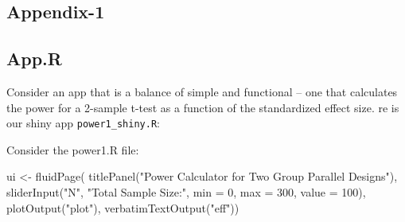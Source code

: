 \documentclass[
  letterpaper,
  DIV=11,
  numbers=noendperiod,
  oneside]{scrartcl}
\newenvironment{Shaded}{\begin{snugshade}}{\end{snugshade}}
\newcommand{\ErrorTok}[1]{\textcolor[rgb]{0.68,0.00,0.00}{#1}}
\newcommand{\ExtensionTok}[1]{\textcolor[rgb]{0.00,0.23,0.31}{#1}}
\newcommand{\KeywordTok}[1]{\textcolor[rgb]{0.00,0.23,0.31}{#1}}
\newcommand{\NormalTok}[1]{\textcolor[rgb]{0.00,0.23,0.31}{#1}}
\newcommand{\OperatorTok}[1]{\textcolor[rgb]{0.37,0.37,0.37}{#1}}
\newcommand{\StringTok}[1]{\textcolor[rgb]{0.13,0.47,0.30}{#1}}
\begin{document}
\hypertarget{appendix-1}{%
\subsection{Appendix-1}\label{appendix-1}}

\hypertarget{app.r}{%
\subsection{App.R}\label{app.r}}

Consider an app that is a balance of simple and functional -- one that
calculates the power for a 2-sample t-test as a function of the
standardized effect size. re is our shiny app \texttt{power1\_shiny.R}:

Consider the power1.R file:

\begin{Shaded}
\begin{Highlighting}[]

\ExtensionTok{ui} \OperatorTok{\textless{}}\NormalTok{{-} fluidPage}\ErrorTok{(}
\ExtensionTok{titlePanel}\ErrorTok{(}\StringTok{"Power Calculator for Two Group Parallel Designs"}\KeywordTok{)}\ExtensionTok{,}
\ExtensionTok{sliderInput}\ErrorTok{(}\StringTok{"N"}\ExtensionTok{,} \StringTok{"Total Sample Size:"}\NormalTok{, min = 0, max = 300, value = 100}\KeywordTok{)}\ExtensionTok{,}
\ExtensionTok{plotOutput}\ErrorTok{(}\StringTok{"plot"}\KeywordTok{)}\ExtensionTok{,}
\ExtensionTok{verbatimTextOutput}\ErrorTok{(}\StringTok{"eff"}\KeywordTok{))}


\end{Highlighting}
\end{Shaded}
\end{document}
